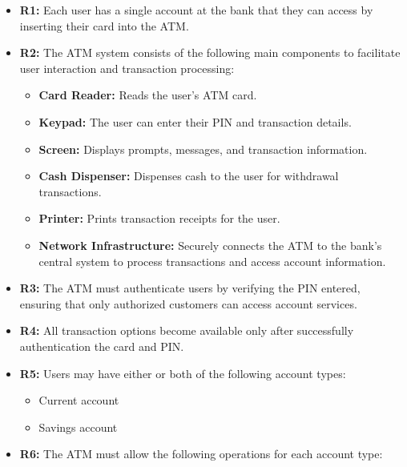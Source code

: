 \begin{itemize}
\item
\protect{}\label{WnDNUNrHcjMr2W_zvVd3u}
\textbf{R1:} Each user has a single account at the bank that they can access by inserting their card into the ATM.
\item
\protect{}\label{2nV7XSAoXenSQ5qjFuMrF}
\textbf{R2:} The ATM system consists of the following main components to facilitate user interaction and transaction processing:

\begin{itemize}
\item
\protect{}\label{jc_AYLO5G2fKus6nk1FCa}
\textbf{Card Reader:} Reads the user's ATM card.
\item
\protect{}\label{Ba0m8O7erTdBwneKSDTnH}
\textbf{Keypad:} The user can enter their PIN and transaction details.
\item
\protect{}\label{i4lVxjSAHpx0bIKaUykXm}
\textbf{Screen:} Displays prompts, messages, and transaction information.
\item
\protect{}\label{NdASWVytHwItwZcNQjyS6}
\textbf{Cash Dispenser:} Dispenses cash to the user for withdrawal transactions.
\item
\protect{}\label{d6mnhTvv7Dw5cyWS7xZ8M}
\textbf{Printer:} Prints transaction receipts for the user.
\item
\protect{}\label{C6lowRSxsSfo_-m4vtRK2}
\textbf{Network Infrastructure:} Securely connects the ATM to the bank's central system to process transactions and access account information.
\end{itemize}
\item
\protect{}\label{AXm91wvUv8Q29LhE8fKae}
\textbf{R3:} The ATM must authenticate users by verifying the PIN entered, ensuring that only authorized customers can access account services.
\item
\protect{}\label{Vtf1dzSu2NvUQB9UDQqwK}
\textbf{R4:} All transaction options become available only after successfully authentication the card and PIN.
\item
\protect{}\label{HM0rALpEmI62k7zlLkUb2}
\textbf{R5:} Users may have either or both of the following account types:

\begin{itemize}
\item
\protect{}\label{ig9kgcweyxztfJjPOF5z0}
Current account
\item
\protect{}\label{cxsk2-BDfQZ4tIekebDpD}
Savings account
\end{itemize}
\item
\protect{}\label{jYEjQvw70SaNdgGKkLqUj}
\textbf{R6:} The ATM must allow the following operations for each account type:


\end{itemize}

